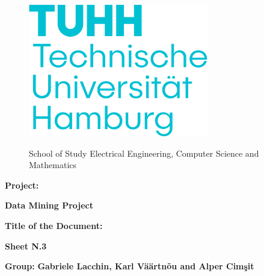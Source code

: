 \begin{titlepage}
    \begin{figure}[!htb]
        \includegraphics[width=0.7\textwidth]{img/png/TUHH_logo-wortmarke_de_rgb.png}
        \endminipage
        \hfill
        \begin{flushright}
            \Large
            School of Study Electrical Engineering, Computer Science and Mathematics
        \end{flushright}
        \endminipage
        \hfill
    \end{figure}

    \vspace{3cm}

    \large
    \textbf{Project:}
    \begin{center}
        \Huge
        \color{blue}
        \textbf{Data Mining Project}
    \end{center}

    \vspace{1cm}

    \textbf{Title of the Document:}
    \begin{center}
        \huge
        \color{blue}
        \textbf{Sheet N.3}\\
    \end{center}

    \vspace{2cm}


    \begin{center}
        \large
        \textbf{Group: }
        \textbf{Gabriele Lacchin, Karl Väärtnõu and Alper Cimşit}
    \end{center}

\end{titlepage}